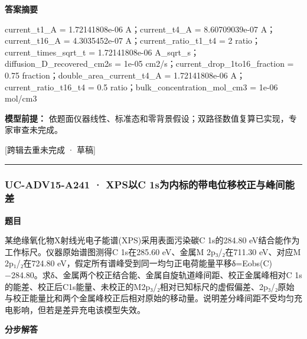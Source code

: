 \documentclass[UTF8,11pt,a4paper]{ctexart}
\begin{document}
\noindent\textbf{答案摘要}\par
current\_t1\_A = 1.72141808e-06 A；current\_t4\_A = 8.60709039e-07 A；current\_t16\_A = 4.3035452e-07 A；current\_ratio\_t1\_t4 = 2 ratio；current\_times\_sqrt\_t = 1.72141808e-06 A\_sqrt\_s；diffusion\_D\_recovered\_cm2s = 1e-05 cm2/s；current\_drop\_1to16\_fraction = 0.75 fraction；double\_area\_current\_t4\_A = 1.72141808e-06 A；current\_ratio\_t16\_t4 = 0.5 ratio；bulk\_concentration\_mol\_cm3 = 1e-06 mol/cm3\par
\noindent\textbf{模型前提：}
依题面仪器线性、标准态和零背景假设；双路径数值复算已实现，专家审查未完成。\par
\noindent\textcolor{red!65!black}{[跨辑去重未完成 · 草稿]} \par
\medskip\hrule\medskip
{}
\subsubsection*{UC-ADV15-A241 · XPS以C 1s为内标的带电位移校正与峰间能差}
\noindent\textbf{题目}\par
某绝缘氧化物X射线光电子能谱(XPS)采用表面污染碳C 1s的284.80 eV结合能作为工作标尺。仪器原始谱图测得C 1s在285.60 eV、金属M 2p₃/₂在711.30 eV、对应M 2p₁/₂在724.80 eV，假定所有谱峰受到同一均匀正电荷能量平移δ=Eobs(C)−284.80。求δ、金属两个校正结合能、金属自旋轨道峰间距、校正金属峰相对C 1s的能差、校正后C1s能量、未校正的M2p₃/₂相对已知标尺的虚假偏差、2p₃/₂原始与校正能量比和两个金属峰校正后相对原始的移动量。说明差分峰间距不受均匀充电影响，但若是差异充电该模型失效。\par
\medskip\noindent\textbf{分步解答}
\end{document}
